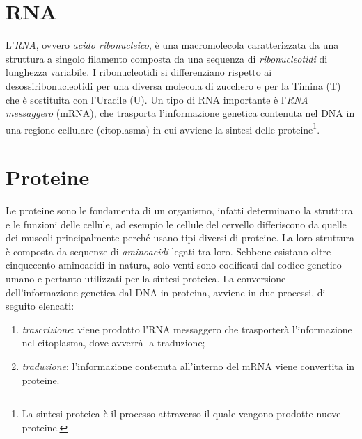 \section{RNA}
L'\textit{RNA}, ovvero \textit{acido ribonucleico}, è una macromolecola caratterizzata da una struttura a singolo filamento composta da una sequenza di \textit{ribonucleotidi} di lunghezza variabile.
\newline
I ribonucleotidi si differenziano rispetto ai desossiribonucleotidi per una diversa molecola di zucchero e per la Timina (T) che è sostituita con l'Uracile (U).
\newline
Un tipo di RNA importante è l'\textit{RNA messaggero} (mRNA), che trasporta l'informazione genetica contenuta nel DNA in una regione cellulare (citoplasma) in cui avviene la sintesi delle proteine\footnote{La sintesi proteica è il processo attraverso il quale vengono prodotte nuove proteine.}.

\section{Proteine}
Le proteine sono le fondamenta di un organismo, infatti determinano la struttura e le funzioni delle cellule, ad esempio le cellule del cervello differiscono da quelle dei muscoli principalmente perché usano tipi diversi di proteine.
La loro struttura è composta da sequenze di \textit{aminoacidi} legati tra loro.
\newline
Sebbene esistano oltre cinquecento aminoacidi in natura, solo venti sono codificati dal codice genetico umano e pertanto utilizzati per la sintesi proteica.
\newline
La conversione dell'informazione genetica dal DNA in proteina, avviene in due processi, di seguito elencati:
\begin{enumerate}
	\item \textit{trascrizione}: viene prodotto l'RNA messaggero che trasporterà l'informazione nel citoplasma, dove avverrà la traduzione;
	\item \textit{traduzione}: l'informazione contenuta all'interno del mRNA viene convertita in proteine.
\end{enumerate}